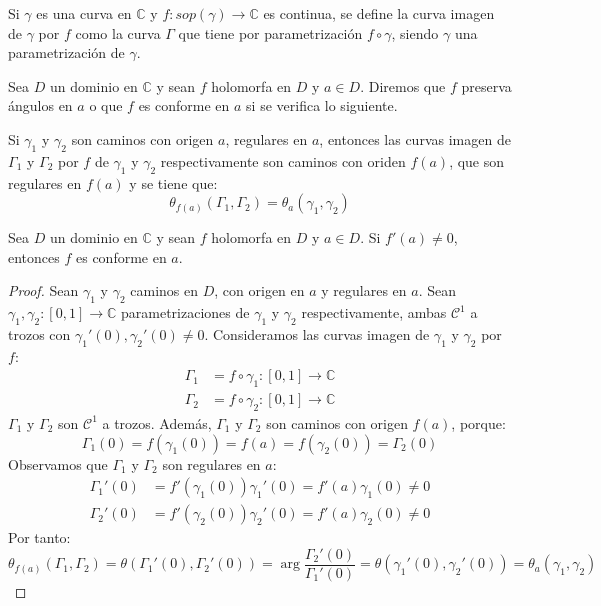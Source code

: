 \begin{definition}
    Si $\gamma$ es una curva en $\mathbb{C}$ y $f: sop(\gamma) \to \mathbb{C}$ es continua, se define la curva imagen de $\gamma$ por $f$ como la curva $\Gamma$ que tiene por parametrización $f \circ \gamma$, siendo $\gamma$ una parametrización de $\gamma$.
\end{definition}

\begin{definition}
    Sea $D$ un dominio en $\mathbb{C}$ y sean $f$ holomorfa en $D$ y $a \in D$.
    Diremos que $f$ preserva ángulos en $a$ o que $f$ es conforme en $a$ si se verifica lo siguiente.

    Si $\gamma_1$ y $\gamma_2$ son caminos con origen $a$, regulares en $a$, entonces las curvas imagen de $\Gamma_1$ y $\Gamma_2$ por $f$ de $\gamma_1$ y $\gamma_2$ respectivamente son caminos con oriden $f(a)$, que son regulares en $f(a)$ y se tiene que:
    $$\theta_{f(a)}(\Gamma_1, \Gamma_2) = \theta_a(\gamma_1, \gamma_2)$$
\end{definition}

\begin{theorem}
    Sea $D$ un dominio en $\mathbb{C}$ y sean $f$ holomorfa en $D$ y $a \in D$.
    Si $f'(a) \neq 0$, entonces $f$ es conforme en $a$.
\end{theorem}

\begin{proof}
    Sean $\gamma_1$ y $\gamma_2$ caminos en $D$, con origen en $a$ y regulares en $a$.
    Sean $\gamma_1, \gamma_2: [0, 1] \to \mathbb{C}$ parametrizaciones de $\gamma_1$ y $\gamma_2$ respectivamente, ambas $\mathcal{C}^1$ a trozos con $\gamma_1'(0), \gamma_2'(0) \neq 0$.
    Consideramos las curvas imagen de $\gamma_1$ y $\gamma_2$ por $f$:
    \begin{align*}
        \Gamma_1 & = f \circ \gamma_1: [0, 1] \to \mathbb{C} \\
        \Gamma_2 & = f \circ \gamma_2: [0, 1] \to \mathbb{C}
    \end{align*}
    $\Gamma_1$ y $\Gamma_2$ son $\mathcal{C}^1$ a trozos.
    Además, $\Gamma_1$ y $\Gamma_2$ son caminos con origen $f(a)$, porque:
    $$\Gamma_1(0) = f(\gamma_1(0)) = f(a) = f(\gamma_2(0)) = \Gamma_2(0)$$
    Observamos que $\Gamma_1$ y $\Gamma_2$ son regulares en $a$:
    \begin{align*}
        \Gamma_1'(0) & = f'(\gamma_1(0))\gamma_1'(0) = f'(a)\gamma_1(0) \neq 0 \\
        \Gamma_2'(0) & = f'(\gamma_2(0))\gamma_2'(0) = f'(a)\gamma_2(0) \neq 0
    \end{align*}
    Por tanto:
    $$\theta_{f(a)}(\Gamma_1, \Gamma_2) = \theta(\Gamma_1'(0), \Gamma_2'(0)) = \arg \frac{\Gamma_2'(0)}{\Gamma_1'(0)} = \theta(\gamma_1'(0), \gamma_2'(0)) = \theta_a(\gamma_1, \gamma_2)$$
\end{proof}

